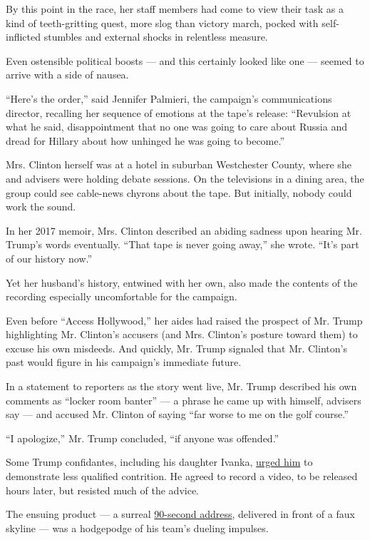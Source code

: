 By this point in the race, her staff members had come to view their task
as a kind of teeth-gritting quest, more slog than victory march, pocked
with self-inflicted stumbles and external shocks in relentless measure.

Even ostensible political boosts --- and this certainly looked like one
--- seemed to arrive with a side of nausea.

``Here's the order,'' said Jennifer Palmieri, the campaign's
communications director, recalling her sequence of emotions at the
tape's release: ``Revulsion at what he said, disappointment that no one
was going to care about Russia and dread for Hillary about how unhinged
he was going to become.''

Mrs. Clinton herself was at a hotel in suburban Westchester County,
where she and advisers were holding debate sessions. On the televisions
in a dining area, the group could see cable-news chyrons about the tape.
But initially, nobody could work the sound.

In her 2017 memoir, Mrs. Clinton described an abiding sadness upon
hearing Mr. Trump's words eventually. ``That tape is never going away,''
she wrote. ``It's part of our history now.''

Yet her husband's history, entwined with her own, also made the contents
of the recording especially uncomfortable for the campaign.

Even before ``Access Hollywood,'' her aides had raised the prospect of
Mr. Trump highlighting Mr. Clinton's accusers (and Mrs. Clinton's
posture toward them) to excuse his own misdeeds. And quickly, Mr. Trump
signaled that Mr. Clinton's past would figure in his campaign's
immediate future.

In a statement to reporters as the story went live, Mr. Trump described
his own comments as ``locker room banter'' --- a phrase he came up with
himself, advisers say --- and accused Mr. Clinton of saying ``far worse
to me on the golf course.''

``I apologize,'' Mr. Trump concluded, ``if anyone was offended.''

Some Trump confidantes, including his daughter Ivanka,
\href{https://www.nytimes.com/2017/05/02/us/politics/ivanka-trump.html}{urged
him} to demonstrate less qualified contrition. He agreed to record a
video, to be released hours later, but resisted much of the advice.

The ensuing product --- a surreal
\href{https://www.facebook.com/DonaldTrump/videos/here-is-my-statementive-never-said-im-a-perfect-person-nor-pretended-to-be-someo/10157844642270725/}{90-second
address}, delivered in front of a faux skyline --- was a hodgepodge of
his team's dueling impulses.

